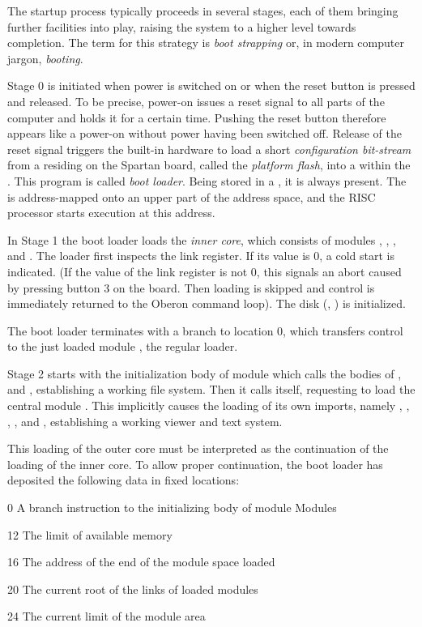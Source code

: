 The startup process typically proceeds in several stages, each of them bringing further facilities into play, raising the system to a higher level towards completion. The term for this strategy is \emph{boot strapping} or, in modern computer jargon, \emph{booting}.

Stage 0 is initiated when power is switched on or when the reset button is pressed and released. To be precise, power-on issues a reset signal to all parts of the computer and holds it for a certain time. Pushing the reset button therefore appears like a power-on without power having been switched off. Release of the reset signal triggers the built-in  hardware to load a short \emph{configuration bit-stream} from a  residing on the Spartan board, called the \emph{platform flash}, into a  within the . This program is called \emph{boot loader}. Being stored in a , it is always present. The  is address-mapped onto an upper part of the address space, and the RISC processor starts execution at this address.

In Stage 1 the boot loader loads the \emph{inner core}, which consists of modules , , , and . The loader first inspects the link register. If its value is 0, a cold start is indicated. (If the value of the link register is not 0, this signals an abort caused by pressing button 3 on the board. Then loading is skipped and control is immediately returned to the Oberon command loop). The disk (\sdcard, ) is initialized.

The boot loader terminates with a branch to location 0, which transfers control to the just loaded module , the regular loader.

Stage 2 starts with the initialization body of module  which calls the bodies of ,  and , establishing a working file system. Then it calls itself, requesting to load the central module . This implicitly causes the loading of its own imports, namely , , , , and , establishing a working viewer and text system.

This loading of the outer core must be interpreted as the continuation of the loading of the inner core. To allow proper continuation, the boot loader has deposited the following data in fixed locations:

\item{ 0} A branch instruction to the initializing body of module Modules
\item{12} The limit of available memory
\item{16} The address of the end of the module space loaded
\item{20} The current root of the links of loaded modules
\item{24} The current limit of the module area

